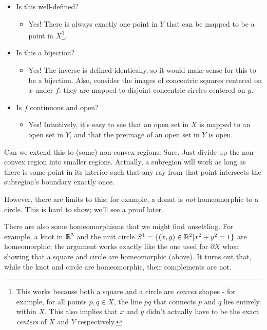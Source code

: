 \begin{itemize}
\item Is this well-defined?  
\begin{itemize}\item Yes!  There is always exactly one point in $Y$ that can be mapped to be a point in $X$\footnote{This works because both a square and a circle are \emph{convex} shapes - for example, for all points $p,q\in X$, the line $\overline{pq}$ that connects $p$ and $q$ lies entirely within $X$.  This also implies that $x$ and $y$ didn't actually have to be the exact \emph{centers} of $X$ and $Y$ respectively.}.\end{itemize}
\item Is this a bijection? 
\begin{itemize}\item Yes!  The inverse is defined identically, so it would make sense for this to be a bijection.  Also, consider the images of concentric squares centered on $x$ under $f$: they are mapped to disjoint concentric circles centered on $y$.\end{itemize}
\item Is $f$ continuous and open?
\begin{itemize}
\item Yes!  Intuitively, it's easy to see that an open set in $X$ is mapped to an open set in $Y$, and that the preimage of an open set in $Y$ is open.
\end{itemize}
\end{itemize}

Can we extend this to (some) non-convex regions:
\placeholder\placeholder
Sure.  Just divide up the non-convex region into smaller regions.  Actually, a subregion will work as long as there is some point in its interior such that any ray from that point intersects the subregion's boundary exactly once.

However, there are limits to this: for example, a donut is \emph{not} homeomorphic to a circle.  This is hard to show; we'll see a proof later.

There are also some homeomorphisms that we might find unsettling.  For example, a knot in $\mathbb R^3$ and the unit circle $S^1 = \{ (x,y)\in\mathbb R^2 | x^2+y^2 = 1\}$ are homeomorphic; the argument works exactly like the one used for $\partial X$ when showing that a square and circle are homeomorphic (above).  It turns out that, while the knot and circle are homeomorphic, their complements are not.

